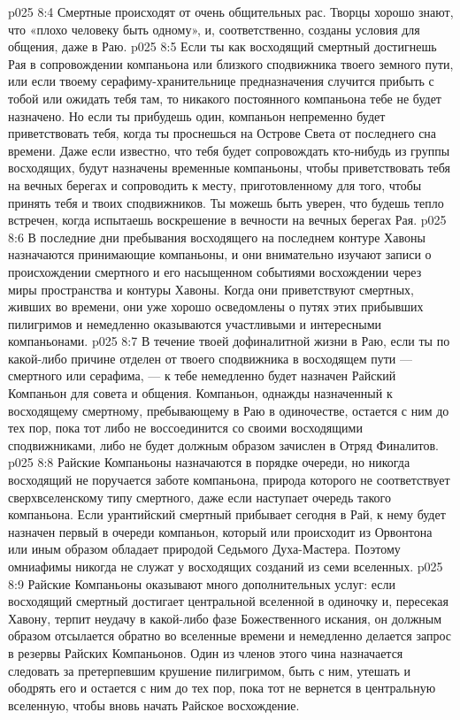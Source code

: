 \vs p025 8:4 Смертные происходят от очень общительных рас. Творцы хорошо знают, что «плохо человеку быть одному», и, соответственно, созданы условия для общения, даже в Раю.
\vs p025 8:5 \pc Если ты как восходящий смертный достигнешь Рая в сопровождении компаньона или близкого сподвижника твоего земного пути, или если твоему серафиму\hyp{}хранительнице предназначения случится прибыть с тобой или ожидать тебя там, то никакого постоянного компаньона тебе не будет назначено. Но если ты прибудешь один, компаньон непременно будет приветствовать тебя, когда ты проснешься на Острове Света от последнего сна времени. Даже если известно, что тебя будет сопровождать кто\hyp{}нибудь из группы восходящих, будут назначены временные компаньоны, чтобы приветствовать тебя на вечных берегах и сопроводить к месту, приготовленному для того, чтобы принять тебя и твоих сподвижников. Ты можешь быть уверен, что будешь тепло встречен, когда испытаешь воскрешение в вечности на вечных берегах Рая.
\vs p025 8:6 В последние дни пребывания восходящего на последнем контуре Хавоны назначаются принимающие компаньоны, и они внимательно изучают записи о происхождении смертного и его насыщенном событиями восхождении через миры пространства и контуры Хавоны. Когда они приветствуют смертных, живших во времени, они уже хорошо осведомлены о путях этих прибывших пилигримов и немедленно оказываются участливыми и интересными компаньонами.
\vs p025 8:7 В течение твоей дофиналитной жизни в Раю, если ты по какой\hyp{}либо причине отделен от твоего сподвижника в восходящем пути --- смертного или серафима, --- к тебе немедленно будет назначен Райский Компаньон для совета и общения. Компаньон, однажды назначенный к восходящему смертному, пребывающему в Раю в одиночестве, остается с ним до тех пор, пока тот либо не воссоединится со своими восходящими сподвижниками, либо не будет должным образом зачислен в Отряд Финалитов.
\vs p025 8:8 \pc Райские Компаньоны назначаются в порядке очереди, но никогда восходящий не поручается заботе компаньона, природа которого не соответствует сверхвселенскому типу смертного, даже если наступает очередь такого компаньона. Если урантийский смертный прибывает сегодня в Рай, к нему будет назначен первый в очереди компаньон, который или происходит из Орвонтона или иным образом обладает природой Седьмого Духа\hyp{}Мастера. Поэтому омниафимы никогда не служат у восходящих созданий из семи вселенных.
\vs p025 8:9 \pc Райские Компаньоны оказывают много дополнительных услуг: если восходящий смертный достигает центральной вселенной в одиночку и, пересекая Хавону, терпит неудачу в какой\hyp{}либо фазе Божественного искания, он должным образом отсылается обратно во вселенные времени и немедленно делается запрос в резервы Райских Компаньонов. Один из членов этого чина назначается следовать за претерпевшим крушение пилигримом, быть с ним, утешать и ободрять его и остается с ним до тех пор, пока тот не вернется в центральную вселенную, чтобы вновь начать Райское восхождение.

